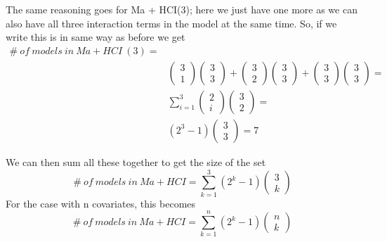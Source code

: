 The same reasoning goes for Ma + HCI(3); here we just have one more as we can also have all three interaction terms in the model at the same time. So, if we write this is in same way as before we get
\begin{equation*}
\begin{aligned}
\#\ of\ models\ in\ Ma+HCI\ \left(3\right)=\\
&\left( \begin{array}{c}
3 \\ 
1 \end{array}
\right)\left( \begin{array}{c}
3 \\ 
3 \end{array}
\right)+\left( \begin{array}{c}
3 \\ 
2 \end{array}
\right)\left( \begin{array}{c}
3 \\ 
3 \end{array}
\right)+\left( \begin{array}{c}
3 \\ 
3 \end{array}
\right)\left( \begin{array}{c}
3 \\ 
3 \end{array}
\right)= \\
&\sum^3_{i=1}{\left( \begin{array}{c}
2 \\ 
i \end{array}
\right)}\left( \begin{array}{c}
3 \\ 
2 \end{array}
\right)= \\
&\left(2^3-1\right)\left( \begin{array}{c}
3 \\ 
3 \end{array}
\right)=7
\end{aligned}
\end{equation*}


We can then sum all these together to get the size of the set
\[\#\ of\ models\ in\ Ma+HCI=\sum^3_{k=1}{(2^k-1)\left( \begin{array}{c}
3 \\ 
k \end{array}
\right)}\] 
For the case with n covariates, this becomes
\[\#\ of\ models\ in\ Ma+HCI=\sum^n_{k=1}{(2^k-1)\left( \begin{array}{c}
n \\ 
k \end{array}
\right)}\] 

